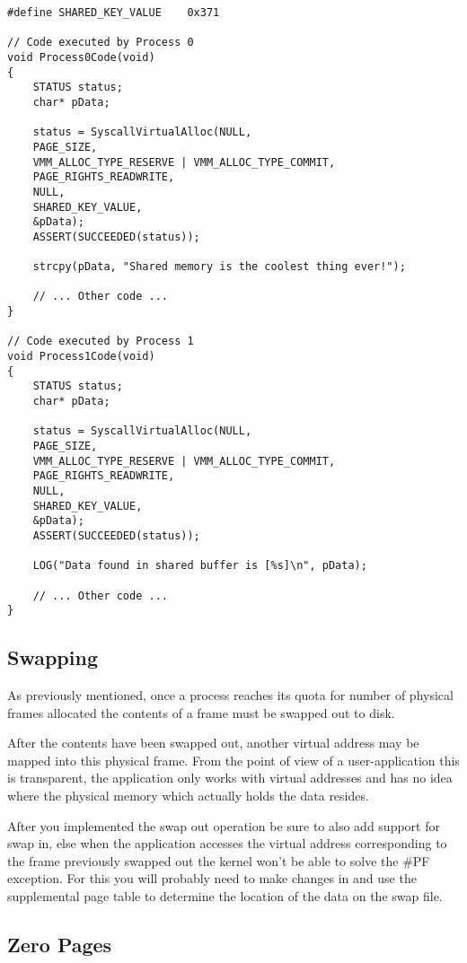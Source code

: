 \begin{lstlisting}[caption={Shared Memory},label={lst:SharedMemory}]
#define SHARED_KEY_VALUE	0x371

// Code executed by Process 0
void Process0Code(void)
{
	STATUS status;
	char* pData;
	
	status = SyscallVirtualAlloc(NULL, 
	PAGE_SIZE, 
	VMM_ALLOC_TYPE_RESERVE | VMM_ALLOC_TYPE_COMMIT,
	PAGE_RIGHTS_READWRITE,
	NULL,
	SHARED_KEY_VALUE,
	&pData);
	ASSERT(SUCCEEDED(status));
	
	strcpy(pData, "Shared memory is the coolest thing ever!");
	
	// ... Other code ...
}

// Code executed by Process 1
void Process1Code(void)
{
	STATUS status;
	char* pData;
	
	status = SyscallVirtualAlloc(NULL, 
	PAGE_SIZE, 
	VMM_ALLOC_TYPE_RESERVE | VMM_ALLOC_TYPE_COMMIT,
	PAGE_RIGHTS_READWRITE,
	NULL,
	SHARED_KEY_VALUE,
	&pData);
	ASSERT(SUCCEEDED(status));
	
	LOG("Data found in shared buffer is [%s]\n", pData);
	
	// ... Other code ...
}
\end{lstlisting}

\subsection{Swapping}

As previously mentioned, once a process reaches its quota for number of physical frames allocated
the contents of a frame must be swapped out to disk.

After the contents have been swapped out, another virtual address may be mapped into this physical
frame. From the point of view of a user-application this is transparent, the application only
works with virtual addresses and has no idea where the physical memory which actually holds the
data resides.

After you implemented the swap out operation be sure to also add support for swap in, else when the
application accesses the virtual address corresponding to the frame previously swapped out the
kernel won't be able to solve the \#PF exception. For this you will probably need to make changes
in  and use the supplemental page table to determine the location of the
data on the swap file.

\subsection{Zero Pages}


